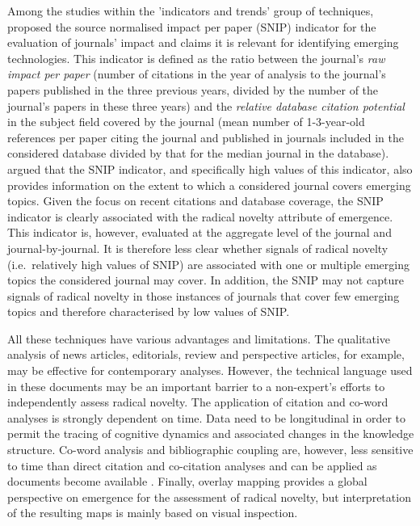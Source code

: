 \documentclass[11pt]{article}
\begin{document}
Among the studies within the 'indicators and trends' group of techniques, \cite{Moed2010} proposed the source normalised impact per paper (SNIP) indicator for the evaluation of journals' impact and claims it is relevant for identifying emerging technologies. This indicator is defined as the ratio between the journal's \textit{raw impact per paper} (number of citations in the year of analysis to the journal's papers published in the three previous years, divided by the number of the journal's papers in these three years) and the \textit{relative database citation potential} in the subject field covered by the journal (mean number of 1-3-year-old references per paper citing the journal and published in journals included in the considered database divided by that for the median journal in the database). \cite{Moed2010} argued that the SNIP indicator, and specifically high values of this indicator, also provides information on the extent to which a considered journal covers emerging topics. Given the focus on recent citations and database coverage, the SNIP indicator is clearly associated with the radical novelty attribute of emergence. This indicator is, however, evaluated at the aggregate level of the journal and journal-by-journal. It is therefore less clear whether signals of radical novelty (i.e.\ relatively high values of SNIP) are associated with one or multiple emerging topics the considered journal may cover. In addition, the SNIP may not capture signals of radical novelty in those instances of journals that cover few emerging topics and therefore characterised by low values of SNIP.  

All these techniques have various advantages and limitations. The qualitative analysis of news articles, editorials, review and perspective articles, for example, may be effective for contemporary analyses.  However, the technical language used in these documents may be an important barrier to a non-expert's efforts to independently assess radical novelty. The application of citation and co-word analyses is strongly dependent on time. Data need to be longitudinal in order to permit the tracing of cognitive dynamics and associated changes in the knowledge structure. Co-word analysis and bibliographic coupling are, however, less sensitive to time than direct citation and co-citation analyses and can be applied as documents become available \citep[e.g.][]{Breitzman2015}. Finally, overlay mapping provides a global perspective on emergence for the assessment of radical novelty, but interpretation of the resulting maps is mainly based on visual inspection.
\end{document}
